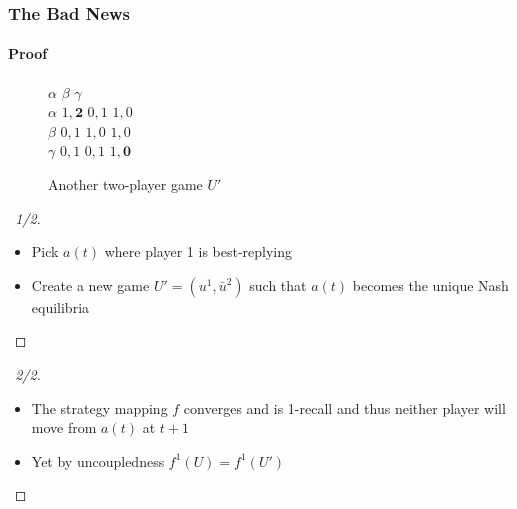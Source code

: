 \documentclass{beamer}
\begin{document}
\begin{frame}
    \frametitle{The Bad News}
    \framesubtitle{Proof}
    \vspace{-20pt}
    \begin{figure}[h]
    \centering
    \begin{game}{3}{3}
            \>  $\alpha$ \>  $\beta$  \> $\gamma$ \\
         $\alpha$    \> {\color{eth7}$1, \mathbf{2}$} \> $0, 1$ \> $1,0$\\
         $\beta$      \>  $0, 1$ \> $1, 0$ \> $1, 0$\\
         $\gamma$ \>  $0, 1$ \> $0, 1$ \> {\color{eth7}$1, \mathbf{0}$}\\
    \end{game}
    \caption{Another two-player game $U'$}
    \label{fig:example1}
    \end{figure}
    \vspace{-10pt}
    \begin{overprint}
        \begin{proof}[\proofname\ 1/2]
            \let\qed\relax
            \begin{itemize}
                \item Pick $a(t)$ where player 1 is best-replying
                \item Create a new game $U' = (u^1, \bar{u}^2)$ such that $a(t)$
                    becomes the unique Nash equilibria
            \end{itemize}
        \end{proof}
        \begin{proof}[\proofname\ 2/2]
            \begin{itemize}
                \item The strategy mapping $f$ converges and is 1-recall and thus
                    neither player will move from $a(t)$ at $t+1$
                \item Yet by uncoupledness $f^1(U) = f^1(U')$
            \end{itemize}
        \end{proof}
    \end{overprint}
%
\end{frame}
\end{document}
